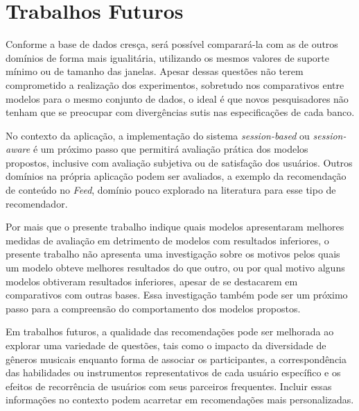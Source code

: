 \section{Trabalhos Futuros}
Conforme a base de dados cresça, será possível comparará-la com as de outros
domínios de forma mais igualitária, utilizando os mesmos valores de suporte
mínimo ou de tamanho das janelas. Apesar dessas questões não terem comprometido
a realização dos experimentos, sobretudo nos comparativos entre modelos para
o mesmo conjunto de dados, o ideal é que novos pesquisadores não tenham que
se preocupar com divergências sutis nas especificações de cada banco.

No contexto da aplicação, a implementação do sistema \textit{session-based} ou
\textit{session-aware} é um próximo passo que permitirá avaliação prática dos
modelos propostos, inclusive com avaliação subjetiva ou de satisfação dos
usuários. Outros domínios na própria aplicação podem ser avaliados, a exemplo da
recomendação de conteúdo no \textit{Feed}, domínio pouco explorado na literatura
para esse tipo de recomendador.

Por mais que o presente trabalho indique quais modelos apresentaram
melhores medidas de avaliação em detrimento de modelos com resultados
inferiores, o presente trabalho não apresenta uma investigação sobre
os motivos pelos quais um modelo obteve melhores resultados do que
outro, ou por qual motivo alguns modelos obtiveram resultados
inferiores, apesar de se destacarem em comparativos com outras bases. Essa
investigação também pode ser um próximo passo para a compreensão do
comportamento dos modelos propostos.


Em trabalhos futuros, a qualidade das recomendações pode ser melhorada ao
explorar uma variedade de questões, tais como o impacto da diversidade de
gêneros musicais enquanto forma de associar os participantes, a correspondência
das habilidades ou instrumentos representativos de cada usuário específico e os
efeitos de recorrência de usuários com seus parceiros frequentes. Incluir essas
informações no contexto podem acarretar em recomendações mais personalizadas.